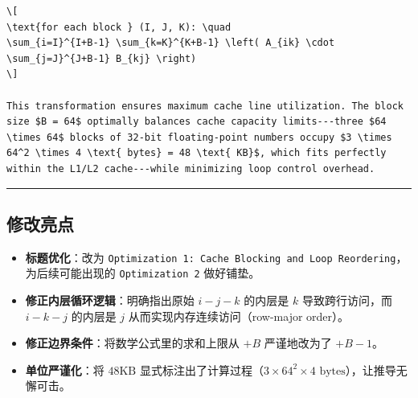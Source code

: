 \documentclass[11pt, a4paper]{article}
\begin{document}
\begin{aibox}
\begin{tcolorbox}[colback=white,colframe=gray!50!white,boxrule=0.5pt,arc=2pt,left=5pt,right=5pt,top=5pt,bottom=5pt]
\begin{verbatim}
\[
\text{for each block } (I, J, K): \quad
\sum_{i=I}^{I+B-1} \sum_{k=K}^{K+B-1} \left( A_{ik} \cdot \sum_{j=J}^{J+B-1} B_{kj} \right)
\]

This transformation ensures maximum cache line utilization. The block size $B = 64$ optimally balances cache capacity limits---three $64 \times 64$ blocks of 32-bit floating-point numbers occupy $3 \times 64^2 \times 4 \text{ bytes} = 48 \text{ KB}$, which fits perfectly within the L1/L2 cache---while minimizing loop control overhead.
\end{verbatim}
\end{tcolorbox}

\begin{center}\rule{\textwidth}{0.4pt}\end{center}

\subsection*{修改亮点}
\begin{itemize}
    \item \textbf{标题优化}：改为 \texttt{Optimization 1: Cache Blocking and Loop Reordering}，为后续可能出现的 \texttt{Optimization 2} 做好铺垫。
    \item \textbf{修正内层循环逻辑}：明确指出原始 $i-j-k$ 的内层是 $k$ 导致跨行访问，而 $i-k-j$ 的内层是 $j$ 从而实现内存连续访问（row-major order）。
    \item \textbf{修正边界条件}：将数学公式里的求和上限从 $+B$ 严谨地改为了 $+B-1$。
    \item \textbf{单位严谨化}：将 $48\text{KB}$ 显式标注出了计算过程（$3 \times 64^2 \times 4 \text{ bytes}$），让推导无懈可击。
\end{itemize}

\end{aibox}

\vspace{1.5em}
\end{document}
